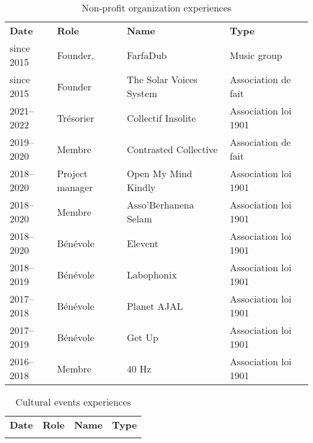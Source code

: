 \documentclass[a4paper,12pt]{article}
\begin{document}
\begin{longtable}{|p{2cm}|p{3cm}|p{5cm}|p{7cm}|}
\caption{Non-profit organization experiences}
\\
\textbf{Date} & \textbf{Role} & \textbf{Name} & \textbf{Type}\\
since 2015 & Founder, & FarfaDub & Music group\\
since 2015 & Founder & The Solar Voices System & Association de fait\\
2021–2022 & Trésorier & Collectif Insolite & Association loi 1901\\
2019–2020 & Membre & Contrasted Collective & Association de fait\\
2018–2020 & Project manager & Open My Mind Kindly & Association loi 1901\\
2018–2020 & Membre & Asso’Berhanena Selam & Association loi 1901\\
2018–2020 & Bénévole & Elevent & Association loi 1901\\
2018–2019 & Bénévole & Labophonix & Association loi 1901\\
2017–2018 & Bénévole & Planet AJAL & Association loi 1901\\
2017–2019 & Bénévole & Get Up & Association loi 1901\\
2016–2018 & Membre & 40 Hz & Association loi 1901\\
\end{longtable}

\begin{longtable}{|p{2cm}|p{3cm}|p{5cm}|p{7cm}|}
\caption{Cultural events experiences}
\\
\textbf{Date} & \textbf{Role} & \textbf{Name} & \textbf{Type}\\
 &  &  & \\
\end{longtable}
\end{document}
